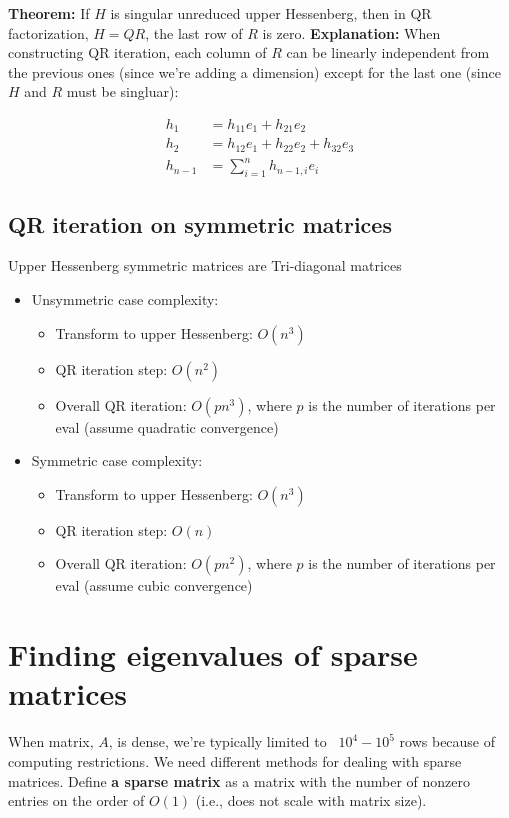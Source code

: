 \documentclass{article}
\begin{document}
\textbf{Theorem:} If $H$ is singular unreduced upper Hessenberg, then in QR factorization, $H=QR$, the last row of $R$ is zero. \textbf{Explanation: } When constructing QR iteration, each column of $R$ can be linearly independent from the previous ones (since we're adding a dimension) except for the last one (since $H$ and $R$ must be singluar):

\begin{align*}
    h_1 &= h_{11}e_1 + h_{21}e_2\\
    h_2 &= h_{12}e_1 + h_{22}e_2 + h_{32}e_3\\
    h_{n-1} &= \sum_{i=1}^n h_{n-1,i}e_i
\end{align*}

\subsection{QR iteration on symmetric matrices}
Upper Hessenberg symmetric matrices are Tri-diagonal matrices
\begin{itemize}
    \item Unsymmetric case complexity:
    \begin{itemize}
        \item Transform to upper Hessenberg: $O(n^3)$
        \item QR iteration step: $O(n^2)$
        \item Overall QR iteration: $O(pn^3)$, where $p$ is the number of iterations per eval (assume quadratic convergence)
    \end{itemize}
    \item Symmetric case complexity:
    \begin{itemize}
        \item Transform to upper Hessenberg: $O(n^3)$
        \item QR iteration step: $O(n)$
        \item Overall QR iteration: $O(pn^2)$, where $p$ is the number of iterations per eval (assume cubic convergence) 
    \end{itemize}
\end{itemize}


\section{Finding eigenvalues of sparse matrices}
When matrix, $A$, is dense, we're typically limited to ~$10^4 - 10^5$ rows because of computing restrictions. We need different methods for dealing with sparse matrices. Define \textbf{a sparse matrix} as a matrix with the number of nonzero entries on the order of $O(1)$ (i.e., does not scale with matrix size).
\end{document}
